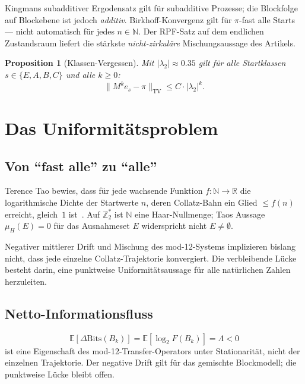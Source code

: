 \documentclass[12pt,a4paper]{article}
\newtheorem{proposition}[satz]{Proposition}
\newcommand{\N}{\mathbb{N}}
\newcommand{\R}{\mathbb{R}}
\newcommand{\Ztwo}{\mathbb{Z}_2}
\newcommand{\TV}{\mathrm{TV}}
\newcommand{\Lam}{\Lambda}
\begin{document}
Kingmans subadditiver Ergodensatz gilt für subadditive Prozesse; die
Blockfolge auf Blockebene ist jedoch \emph{additiv}. Birkhoff-Konvergenz
gilt für $\pi$-fast alle Starts --- nicht automatisch für jedes $n \in \N$.
Der RPF-Satz auf dem endlichen Zustandsraum liefert die stärkste
\emph{nicht-zirkuläre} Mischungsaussage des Artikels.

\begin{proposition}[Klassen-Vergessen]
Mit $|\lambda_2| \approx 0.35$ gilt für alle Startklassen $s \in \{E,A,B,C\}$
und alle $k \geq 0$:
\[
  \|M^k e_s - \pi\|_{\TV} \leq C \cdot |\lambda_2|^k.
\]
\end{proposition}

\section{Das Uniformitätsproblem}
\label{sec:uniformitaet}

\subsection{Von ``fast alle'' zu ``alle''}

Terence Tao bewies, dass für jede wachsende Funktion $f:\N\to\R$ die
logarithmische Dichte der Startwerte $n$, deren Collatz-Bahn ein Glied
$\leq f(n)$ erreicht, gleich~$1$ ist~\cite{Tao2019}. Auf $\Ztwo^*$ ist
$\N$ eine Haar-Nullmenge; Taos Aussage $\mu_H(E)=0$ für das Ausnahmeset
$E$ widerspricht nicht $E \neq \emptyset$.

\begin{tcolorbox}[kern,
title={Zentrale offene Frage}]
Negativer mittlerer Drift
und
Mischung des mod-12-Systems
implizieren bislang nicht,
dass jede einzelne Collatz-Trajektorie
konvergiert.
Die verbleibende Lücke besteht darin,
eine punktweise Uniformitätsaussage
für alle natürlichen Zahlen herzuleiten.
\end{tcolorbox}

\subsection{Netto-Informationsfluss}

\begin{tcolorbox}[heuristik,title={Operatoreigenschaft vs.\ Trajektorie}]
\[
  \mathbb{E}[\Delta\text{Bits}(B_k)] = \mathbb{E}[\log_2 F(B_k)] = \Lam < 0
\]
ist eine Eigenschaft des mod-12-Transfer-Operators unter Stationarität,
nicht der einzelnen Trajektorie. Der negative Drift gilt für das
gemischte Blockmodell; die punktweise Lücke bleibt offen.
\end{tcolorbox}
\end{document}
